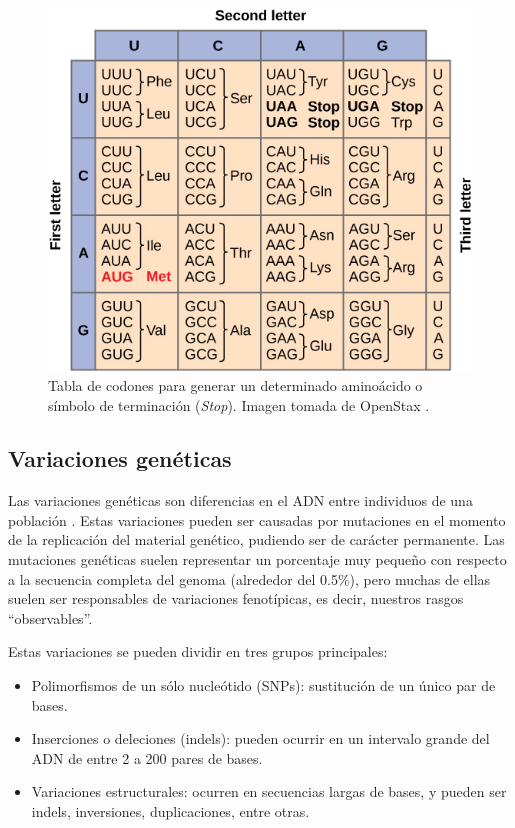\begin{figure}[H]
\centering
    \includegraphics[scale=0.8]{documents/latex/figures/1/tableCodon.jpg}
    \caption{Tabla de codones para generar un determinado aminoácido o símbolo de terminación (\textit{Stop}). Imagen tomada de OpenStax \cite{OpenStaxCNX}.}
    \label{fig:table_codon}
\end{figure}

\newpage

\subsection{Variaciones genéticas}

Las variaciones genéticas son diferencias en el ADN entre individuos de una población \cite{EMBL}. Estas variaciones pueden ser causadas por mutaciones en el momento de la replicación del material genético, pudiendo ser de carácter permanente. Las mutaciones genéticas suelen representar un porcentaje muy pequeño con respecto a la secuencia completa del genoma (alrededor del 0.5\%), pero muchas de ellas suelen ser responsables de variaciones fenotípicas, es decir, nuestros rasgos ``observables''. 

Estas variaciones se pueden dividir en tres grupos principales:

\begin{itemize}
    \item Polimorfismos de un sólo nucleótido (SNPs): sustitución de un único par de bases. 
    \item Inserciones o deleciones (indels): pueden ocurrir en un intervalo grande del ADN de entre 2 a 200 pares de bases.
    
    \item Variaciones estructurales: ocurren en secuencias largas de bases, y pueden ser indels, inversiones, duplicaciones, entre otras.
    
\end{itemize}

